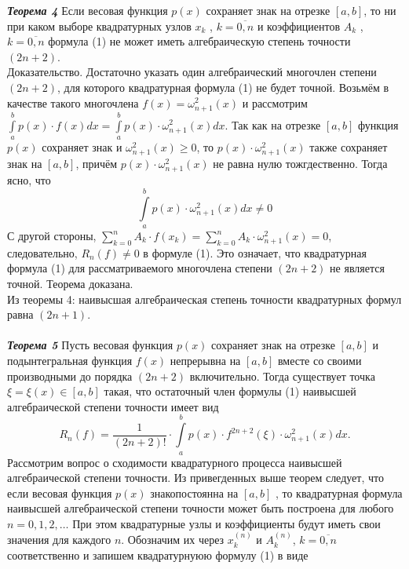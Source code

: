 \documentclass[14pt,a4paper,titlepage]{extarticle}
\begin{document}
\textit{{\textbf{Теорема 4}}}
Если весовая функция $p(x)$ сохраняет знак на отрезке $\left[  a, b\right] $, то ни при каком выборе квадратурных узлов $x_k$ , $k = \overline{0,n}$ и коэффициентов $A_k$ , $k = \overline{0,n}$ формула (1) не может иметь алгебраическую степень точности $( 2n + 2 )$. \\
Доказательство. Достаточно указать один алгебраический многочлен степени
$( 2n + 2 )$, для которого квадратурная формула (1) не будет точной. Возьмём в качестве
такого многочлена $f(x) = \omega_{n+1}^2(x)$ и рассмотрим $\int\limits_a^b p(x)\cdot f(x)dx = \int\limits_a^b p(x)\cdot \omega_{n+1}^2(x)dx$. Так как на отрезке $\left[  a, b\right] $ функция $p(x)$ сохраняет знак и $\omega_{n+1}^2(x) \geqslant 0$, то $p(x)\cdot \omega_{n+1}^2(x)$ также сохраняет знак на $\left[  a, b\right] $, причём $p(x)\cdot \omega_{n+1}^2(x)$ не равна нулю тожгдественно. Тогда ясно, что
$$
\int\limits_a^b p(x)\cdot \omega_{n+1}^2(x)dx \neq 0
$$
С другой стороны, $\sum_{k = 0}^n A_k \cdot f(x_k) = \sum_{k = 0}^n A_k \cdot \omega_{n+1}^2(x) = 0$, следовательно, $R_n(f)\neq 0$ в формуле (1). Это означает, что квадратурная формула (1) для рассматриваемого многочлена степени $( 2n + 2 )$ не является точной. Теорема доказана.
\\
Из теоремы 4: наивысшая алгебраическая степень точности
квадратурных формул равна $( 2n + 1)$.
\\\\
\textit{{\textbf{Теорема 5}}}
Пусть весовая функция $p(x)$ сохраняет знак на отрезке $\left[  a, b\right] $ и
подынтегральная функция $f (x)$ непрерывна на $\left[  a, b\right] $ вместе со своими производными до порядка $(2n + 2)$ включительно. Тогда существует точка $\xi = \xi(x) \in \left[  a, b\right] $ такая, что остаточный член формулы (1) наивысшей алгебраической степени точности имеет вид
\begin{equation}
		R_n(f) = \frac{1}{(2n+2)!}\cdot \int\limits_a^b p(x)\cdot f^{2n+2}(\xi)\cdot \omega_{n+1}^2(x) dx.
		\label{(6)}
	\end{equation}
	Рассмотрим вопрос о сходимости квадратурного процесса наивысшей алгебраической степени точности. Из привегденных выше теорем следует, что если весовая функция $p(x)$ знакопостоянна на $\left[  a, b\right] $ , то квадратурная формула наивысшей алгебраической степени точности может быть построена для любого $n = 0, 1, 2, \ldots$ При этом квадратурные узлы и коэффициенты будут иметь свои значения для каждого $n$. Обозначим их через $x_k^{(n)}$ и $A_k^{(n)}$, $k = \overline{0,n}$ соответственно и запишем квадратурнуюю формулу (1) в виде
\end{document}
